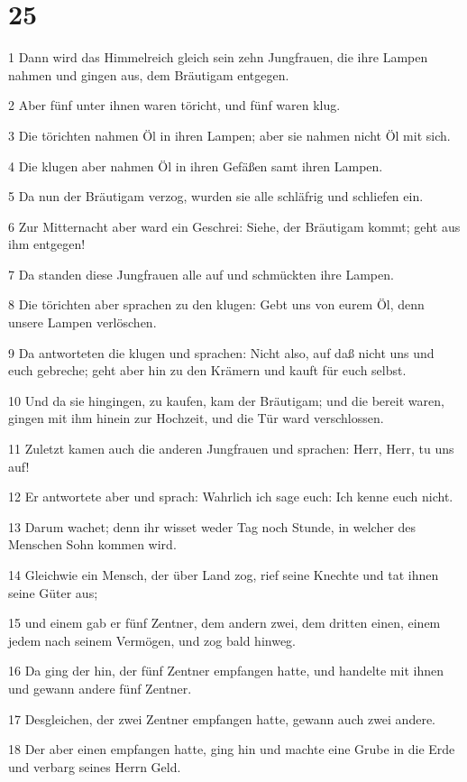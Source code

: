 \chapter{25}

\par 1 Dann wird das Himmelreich gleich sein zehn Jungfrauen, die ihre Lampen nahmen und gingen aus, dem Bräutigam entgegen.
\par 2 Aber fünf unter ihnen waren töricht, und fünf waren klug.
\par 3 Die törichten nahmen Öl in ihren Lampen; aber sie nahmen nicht Öl mit sich.
\par 4 Die klugen aber nahmen Öl in ihren Gefäßen samt ihren Lampen.
\par 5 Da nun der Bräutigam verzog, wurden sie alle schläfrig und schliefen ein.
\par 6 Zur Mitternacht aber ward ein Geschrei: Siehe, der Bräutigam kommt; geht aus ihm entgegen!
\par 7 Da standen diese Jungfrauen alle auf und schmückten ihre Lampen.
\par 8 Die törichten aber sprachen zu den klugen: Gebt uns von eurem Öl, denn unsere Lampen verlöschen.
\par 9 Da antworteten die klugen und sprachen: Nicht also, auf daß nicht uns und euch gebreche; geht aber hin zu den Krämern und kauft für euch selbst.
\par 10 Und da sie hingingen, zu kaufen, kam der Bräutigam; und die bereit waren, gingen mit ihm hinein zur Hochzeit, und die Tür ward verschlossen.
\par 11 Zuletzt kamen auch die anderen Jungfrauen und sprachen: Herr, Herr, tu uns auf!
\par 12 Er antwortete aber und sprach: Wahrlich ich sage euch: Ich kenne euch nicht.
\par 13 Darum wachet; denn ihr wisset weder Tag noch Stunde, in welcher des Menschen Sohn kommen wird.
\par 14 Gleichwie ein Mensch, der über Land zog, rief seine Knechte und tat ihnen seine Güter aus;
\par 15 und einem gab er fünf Zentner, dem andern zwei, dem dritten einen, einem jedem nach seinem Vermögen, und zog bald hinweg.
\par 16 Da ging der hin, der fünf Zentner empfangen hatte, und handelte mit ihnen und gewann andere fünf Zentner.
\par 17 Desgleichen, der zwei Zentner empfangen hatte, gewann auch zwei andere.
\par 18 Der aber einen empfangen hatte, ging hin und machte eine Grube in die Erde und verbarg seines Herrn Geld.
